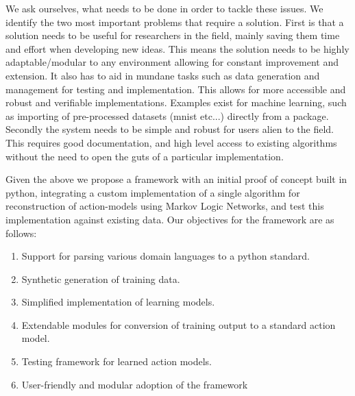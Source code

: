 % 
We ask ourselves, what needs to be done in order to tackle these issues. We identify the two most important problems that require a solution. First is that a solution needs to be useful for researchers in the field, mainly saving them time and effort when developing new ideas. This means the solution needs to be highly adaptable/modular to any environment allowing for constant improvement and extension. It also has to aid in mundane tasks such as data generation and management for testing and implementation. This allows for more accessible and robust and verifiable implementations. Examples exist for machine learning, such as importing of pre-processed datasets (mnist etc...) directly from a package. Secondly the system needs to be simple and robust for users alien to the field. This requires good documentation, and high level access to existing algorithms without the need to open the guts of a particular implementation.

Given the above we propose a framework with an initial proof of concept built in python, integrating a custom implementation of a single algorithm for reconstruction of action-models using Markov Logic Networks, and test this implementation against existing data.
Our objectives for the framework are as follows: \begin{enumerate}
                                                     \item Support for parsing various domain languages to a python standard.
                                                     \item Synthetic generation of training data.
                                                     \item Simplified implementation of learning models.
                                                     \item Extendable modules for conversion of training output to a standard action model.
                                                     \item Testing framework for learned action models.
                                                     \item User-friendly and modular adoption of the framework
\end{enumerate}
